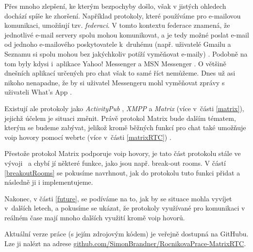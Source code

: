 Přes mnoho zlepšení, ke kterým bezpochyby došlo, však v jistých ohledech dochází
spíše ke zhoršení. Například protokoly, které používáme pro e-mailovou
komunikaci, umožňují tzv. \textit{federaci}. V tomto kontextu federace znamená,
že jednotlivé e-mail servery spolu mohou komunikovat, a je tedy možné poslat
e-mail od jednoho e-mailového poskytovatele k~druhému (např. uživatelé Gmailu a
Seznamu si spolu mohou bez jakýchkoliv potíží vyměňovat e-maily)
\parencite{MatrixORG-FAQ}. Podobně na tom byly kdysi i~aplikace Yahoo! Messenger
a MSN Messenger \parencite{BetaNews-MSYahooToLinkIMNets}. O většině dnešních
aplikací určených pro chat však to samé říct nemůžeme. Dnes už asi nikoho
nenapadne, že by si uživatel Messengeru mohl vyměňovat zprávy s uživateli What's
App \parencite{9To5Mac-InteroperabilityNightmareAndDream}.

Existují ale protokoly jako \textit{ActivityPub} \parencite{W3ORG-ActivityPub},
\textit{XMPP} \parencite{XMPPORG-Homepage} a \textit{Matrix}
\parencite{MatrixORG-Homepage} (více v~části \ref{matrix}), jejichž účelem je
situaci změnit. Právě protokol Matrix bude dalším tématem, kterým se budeme
zabývat, jelikož kromě běžných funkcí pro chat také umožňuje \gls{voip} hovory
pomocí \gls{webrtc} (více v~části \ref{matrixRTC})
\parencite{MatrixORG-Homepage,MatrixORG-Spec}.

Přestože protokol Matrix podporuje \gls{voip} hovory, je tato část protokolu
stále ve vývoji~\parencite{GitHub-MSC3401,GitHub-MSC3898} a chybí jí některé
funkce, jako jsou např. break-out rooms. V částí \ref{breakoutRooms} se pokusíme
navrhnout, jak do protokolu tuto funkci přidat a následně ji i implementujeme.

Nakonec, v části \ref{future}, se podíváme na to, jak by se situace mohla
vyvíjet v~dalších letech, a pokusíme se ukázat, že protokoly využívané pro
komunikaci v reálném čase mají mnoho dalších využití kromě \gls{voip} hovorů.

Aktuální verze práce (s jejím zdrojovým kódem) je veřejně dostupná na GitHubu.
Lze ji nalézt na adrese
\href{https://github.com/SimonBrandner/RocnikovaPrace-MatrixRTC}{github.com/SimonBrandner/RocnikovaPrace-MatrixRTC}.
